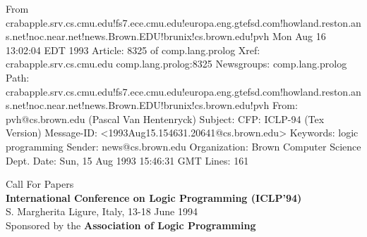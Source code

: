 From crabapple.srv.cs.cmu.edu!fs7.ece.cmu.edu!europa.eng.gtefsd.com!howland.reston.ans.net!noc.near.net!news.Brown.EDU!brunix!cs.brown.edu!pvh Mon Aug 16 13:02:04 EDT 1993
Article: 8325 of comp.lang.prolog
Xref: crabapple.srv.cs.cmu.edu comp.lang.prolog:8325
Newsgroups: comp.lang.prolog
Path: crabapple.srv.cs.cmu.edu!fs7.ece.cmu.edu!europa.eng.gtefsd.com!howland.reston.ans.net!noc.near.net!news.Brown.EDU!brunix!cs.brown.edu!pvh
From: pvh@cs.brown.edu (Pascal Van Hentenryck)
Subject: CFP: ICLP-94 (Tex Version)
Message-ID: <1993Aug15.154631.20641@cs.brown.edu>
Keywords: logic programming
Sender: news@cs.brown.edu
Organization: Brown Computer Science Dept.
Date: Sun, 15 Aug 1993 15:46:31 GMT
Lines: 161

\setlength{\oddsidemargin}{-0.50in}
\setlength{\evensidemargin}{0in}
\setlength{\textwidth}{7.5in}
\setlength{\topmargin}{-0.2in}
\setlength{\headsep}{0.0in}
\setlength{\textheight}{24cm}
\pagestyle{empty}


\begin{center}
{\Large Call For Papers} \\
$ \ $ \\
{\Large\bf International Conference on Logic Programming (ICLP'94)} \\
$ \ $ \\
S. Margherita Ligure, Italy, 13-18 June 1994 \\
$ \ $ \\
Sponsored by the {\bf Association of Logic Programming}
\end{center}


